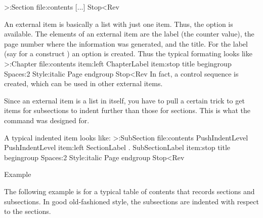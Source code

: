 \Ver>\DefineExternalItem:Section file:contents
    [...] Stop<Rev

An external item is basically a list with just one item. Thus, the
option  is available. The elements of an external item are
the label (the counter value), the page number where the information
was generated, and the title. 
For the label (say for a construct )
an option  is created.
Thus the typical formating looks like
\Ver>\DefineExternalItem:Chapter file:contents
    item:left ChapterLabel item:stop
    title begingroup Spaces:2 Style:italic Page endgroup
    Stop<Rev
In fact, a control sequence  is created, which
can be used in other external items.

Since an external item is a list in itself, you have to pull a
certain trick to get items for subsections to indent further than
those for sections. This is what the command  was
designed for.

A typical indented item looks like:
\Ver>\DefineExternalItem:SubSection file:contents
    PushIndentLevel PushIndentLevel
    item:left SectionLabel . SubSectionLabel item:stop
    title begingroup Spaces:2 Style:italic Page endgroup
    Stop<Rev

\Section Example

The following example is for a typical table of contents that
records sections and subsections. In good old-fashioned style, the
subsections are indented with respect to the sections.
\endinput
\Example
\DefineExternalFile:TheContents=tct
\DefineHeading:TestChapter Style:bold
 line:start TestChapterCounter Spaces:2 title line:stop
 external:TheContents title external:stop Stop
\DefineExternalItem:TestChapter file:TheContents
 item:left Style:bold TestChapterLabel item:stop title white:5pt
      Page par Stop
\DefineHeading:TestSection Style:italic
 line:start TestChapterCounter . TestSectionCounter 
            Spaces:2 title line:stop
 external:TheContents title external:stop Stop
\GoverningCounter:TestSection=TestChapter
\DefineExternalItem:TestSection file:TheContents PushIndentLevel
 item:left Style:bold TestChapterLabel . TestSectionLabel item:stop 
 title white:5pt Page par Stop
\DefineExternalItem:anon file:TheContents begingroup
 Style:italic title white:5pt Page par Stop

\LoadExternalFile:TheContents
\TestChapter First heading\par
\TestSection First subheading\par
Some text might be nice.
\TestSection Second subheading\par
Some more text.
\ToExternalFile:TheContents={Enclosed Graphics}
\TestChapter Second heading\par
\TestSection Third subheading\par
Yet more text.
\TestSection Fourth subheading\par
And again: text.
\ExampleStop

\endinput

92/11/26 BibTeX section
